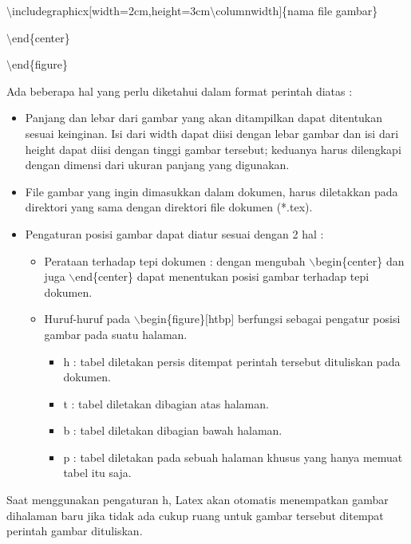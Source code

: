 $\setminus$includegraphicx$[$width=2cm,height=3cm$\setminus$columnwidth$]$\{nama file gambar\}
\par \vspace{12pt}
$\setminus$end\{center\}
\par \vspace{12pt}
$\setminus$end\{figure\}
\par \vspace{12pt}


Ada beberapa hal yang perlu diketahui dalam format perintah diatas :

\begin{itemize}
\item Panjang dan lebar dari gambar yang akan ditampilkan dapat ditentukan sesuai keinginan. Isi dari width dapat diisi dengan lebar gambar dan isi dari height dapat diisi dengan tinggi gambar tersebut; 
keduanya harus dilengkapi dengan dimensi dari ukuran panjang yang digunakan.
\item File gambar yang ingin dimasukkan dalam dokumen, harus diletakkan pada direktori yang sama dengan direktori file dokumen (*.tex).
\end{itemize}

\begin{itemize}
\item Pengaturan posisi gambar dapat diatur sesuai dengan 2 hal :
\begin{itemize}
\item Perataan terhadap tepi dokumen : dengan mengubah 
$\backslash$begin\{center\} dan juga $\backslash$end\{center\} dapat menentukan posisi gambar terhadap tepi dokumen.
\item Huruf-huruf pada $\backslash$begin\{figure\}$[$htbp$]$ berfungsi sebagai pengatur posisi gambar pada suatu halaman.
\begin{itemize}
\item h : tabel diletakan persis ditempat perintah tersebut dituliskan pada dokumen.
\item t : tabel diletakan dibagian atas halaman.
\item b : tabel diletakan dibagian bawah halaman.
\item p : tabel diletakan pada sebuah halaman khusus yang hanya memuat tabel itu saja.
\end{itemize}
\end{itemize}
\end{itemize}
Saat menggunakan pengaturan h, Latex akan otomatis menempatkan gambar dihalaman baru jika tidak ada cukup ruang untuk gambar tersebut ditempat perintah gambar dituliskan.\par \vspace{12pt}

